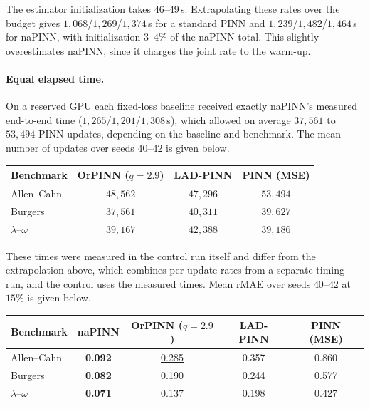 \documentclass[twoside]{article}
\begin{document}
\noindent
The estimator initialization takes $46$--$49$\,s. Extrapolating these rates
over the budget gives $1{,}068$/$1{,}269$/$1{,}374$\,s for a standard PINN and
$1{,}239$/$1{,}482$/$1{,}464$\,s for naPINN, with initialization $3$--$4\%$ of the
naPINN total. This slightly overestimates naPINN, since it charges the joint
rate to the warm-up.

\paragraph{Equal elapsed time.}
On a reserved GPU each fixed-loss baseline received exactly naPINN's measured
end-to-end time ($1{,}265$/$1{,}201$/$1{,}308$\,s), which allowed on average
$37{,}561$ to $53{,}494$ PINN updates, depending on the baseline and benchmark.
The mean number of updates over seeds $40$--$42$ is given below.

\begin{center}\small
\setlength{\tabcolsep}{8pt}
\begin{tabular}{lccc}
\toprule
Benchmark & OrPINN ($q = 2.9$) & LAD-PINN & PINN (MSE) \\
\midrule
Allen--Cahn & $48{,}562$ & $47{,}296$ & $53{,}494$ \\
Burgers & $37{,}561$ & $40{,}311$ & $39{,}627$ \\
$\lambda$--$\omega$ & $39{,}167$ & $42{,}388$ & $39{,}186$ \\
\bottomrule
\end{tabular}
\end{center}

\noindent These times were measured in the control run itself and differ
from the extrapolation above, which combines per-update rates from a separate
timing run, and the control uses the measured times. Mean rMAE over seeds $40$--$42$ at $15\%$ is given below.

\begin{center}\small
\setlength{\tabcolsep}{8pt}
\begin{tabular}{lcccc}
\toprule
Benchmark & naPINN & OrPINN ($q = 2.9$) & LAD-PINN & PINN (MSE) \\
\midrule
Allen--Cahn & \textbf{0.092} & \underline{0.285} & 0.357 & 0.860 \\
Burgers & \textbf{0.082} & \underline{0.190} & 0.244 & 0.577 \\
$\lambda$--$\omega$ & \textbf{0.071} & \underline{0.137} & 0.198 & 0.427 \\
\bottomrule
\end{tabular}
\end{center}
\end{document}

